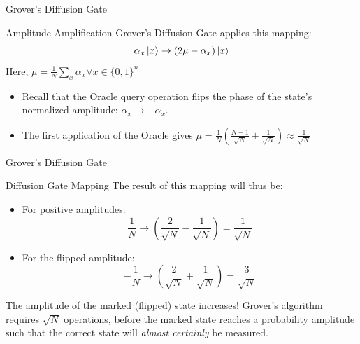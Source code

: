 \documentclass{beamer}
\begin{document}


\begin{frame}{Grover's Diffusion Gate}
	\begin{block}{Amplitude Amplification}
		Grover's Diffusion Gate applies this mapping:
		\begin{equation}
			\alpha_x\ket{x} \rightarrow (2\mu - \alpha_x)\ket{x}
		\end{equation}
		Here, $\mu=\frac{1}{N}\sum_x\alpha_x \forall x\in\{0, 1\}^n$
	\end{block}
	\begin{itemize}
		\item Recall that the Oracle query operation flips the phase of the state's normalized amplitude: $\alpha_x \rightarrow -\alpha_x$.
		\item The first application of the Oracle gives $\mu = \frac{1}{N}(\frac{N-1}{\sqrt{N}} + \frac{1}{\sqrt{N}}) \approx \frac{1}{\sqrt{N}}$
	\end{itemize}
\end{frame}

\begin{frame}{Grover's Diffusion Gate}
	\begin{block}{Diffusion Gate Mapping}
		The result of this mapping will thus be:
		\begin{itemize}
			\item For positive amplitudes:
			      \[
				      \frac{1}{N} \rightarrow (\frac{2}{\sqrt{N}} - \frac{1}{\sqrt{N}}) = \frac{1}{\sqrt{N}}
			      \]
			\item For the flipped amplitude:
			      \[
				      -\frac{1}{N} \rightarrow (\frac{2}{\sqrt{N}} + \frac{1}{\sqrt{N}}) = \frac{3}{\sqrt{N}}
			      \]
		\end{itemize}
		The amplitude of the marked (flipped) state increases! Grover's algorithm requires $\sqrt{N}$ operations, before the marked state reaches a probability amplitude such that the correct state will \textit{almost certainly} be measured.
	\end{block}
\end{frame}
\end{document}
